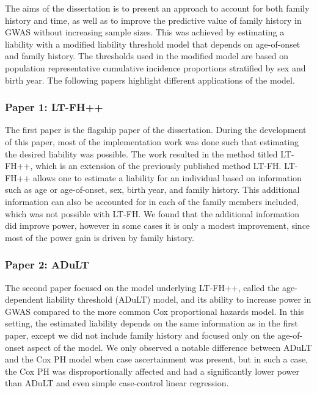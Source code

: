 The aims of the dissertation is to present an approach to account for both family history and time, as well as to improve the predictive value of family history in GWAS without increasing sample sizes. This was achieved by estimating a liability with a modified liability threshold model that depends on age-of-onset and family history. The thresholds used in the modified model are based on population representative cumulative incidence proportions stratified by sex and birth year. The following papers highlight different applications of the model.

\subsubsection{Paper 1: LT-FH++}
The first paper is the flagship paper of the dissertation. During the development of this paper, most of the implementation work was done such that estimating the desired liability was possible. The work resulted in the method titled LT-FH++, which is an extension of the previously published method LT-FH. LT-FH++ allows one to estimate a liability for an individual based on information such as age or age-of-onset, sex, birth year, and family history. This additional information can also be accounted for in each of the family members included, which was not possible with LT-FH. We found that the additional information did improve power, however in some cases it is only a modest improvement, since most of the power gain is driven by family history.

\subsubsection{Paper 2: ADuLT}
The second paper focused on the model underlying LT-FH++, called the age-dependent liability threshold (ADuLT) model, and its ability to increase power in GWAS compared to the more common Cox proportional hazards model. In this setting, the estimated liability depends on the same information as in the first paper, except we did not include family history and focused only on the age-of-onset aspect of the model. We only observed a notable difference between ADuLT and the Cox PH model when case ascertainment was present, but in such a case, the Cox PH was disproportionally affected and had a significantly lower power than ADuLT and even simple case-control linear regression.


